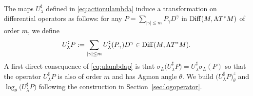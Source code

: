 \documentclass[10pt,a4paper]{amsart}
\numberwithin{equation}{section}
\theoremstyle{definition}
\begin{document}
The maps $U_\lambda^\sharp$ defined in \eqref{eq:actionulambda} induce a transformation on differential operators as follows: for any $P =\sum_{\vert \gamma\vert \leq m} P_\gamma D^\gamma$ in ${\rm Diff}(M,\Lambda T^*M)$ of order $m$, we define
\begin{equation}\label{eq:ulambdap}
U_\lambda^\sharp P:=\sum_{|\gamma|\leq m} U_\lambda^\sharp( P_\gamma) D^\gamma \in {\rm Diff}(M, \Lambda T^*M).
\end{equation}
A first direct consequence of \eqref{eq:ulambdap} is that
$\sigma_L\bigl(U_\lambda^\sharp P\bigr)= U_\lambda^\sharp\sigma_L(P) $ so that the operator $U_\lambda^\sharp P$ is also of order $m$ and has Agmon angle $\theta$. We build $\bigl(U_\lambda^\sharp P\bigr)_\theta^z$ and $\log_\theta\bigl(U_\lambda^\sharp P\bigr)$ following the construction in Section~\ref{sec:logoperator}.
\end{document}
